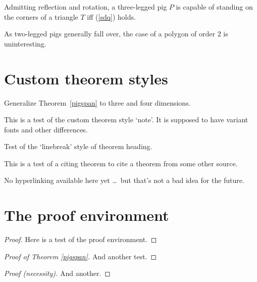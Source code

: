 \begin{cor}
Admitting reflection and rotation, a three-legged pig $P$ is capable of
standing on the corners of a triangle $T$ iff (\ref{sdq}) holds.
\end{cor}

\begin{rmk}
As two-legged pigs generally fall over, the case of a polygon of order
$2$ is uninteresting.
\end{rmk}

\section{Custom theorem styles}

\begin{exer}
Generalize Theorem~\ref{pigspan} to three and four dimensions.
\end{exer}

\begin{note}
This is a test of the custom theorem style `note'. It is supposed to have
variant fonts and other differences.
\end{note}

\begin{bthm}
Test of the `linebreak' style of theorem heading.
\end{bthm}

This is a test of a citing theorem to cite a theorem from some other source.

\begin{varthm}
No hyperlinking available here yet \dots\ but that's not a
bad idea for the future.
\end{varthm}

\section{The proof environment}

\begin{proof}
Here is a test of the proof environment.
\end{proof}

\begin{proof}[Proof of Theorem \ref{pigspan}]
And another test.
\end{proof}

\begin{proof}[Proof \textup(necessity\textup)]
And another.
\end{proof}

